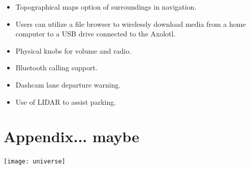 \documentclass[onecolumn, draftclsnofoot,10pt, compsoc]{IEEEtran}
\begin{document}
\begin{itemize}
\begin{itemize}
\item Topographical maps option of surroundings in navigation.
\item Users can utilize a file browser to wirelessly download media from a home computer to a USB drive connected to the Axolotl.
\item Physical knobs for volume and radio.
\item Bluetooth calling support.
\item Dashcam lane departure warning.
\item Use of LIDAR to assist parking.
\end{itemize}
\end{itemize}
\section{Appendix... maybe}
\texttt{[image: universe]}
\end{document}
